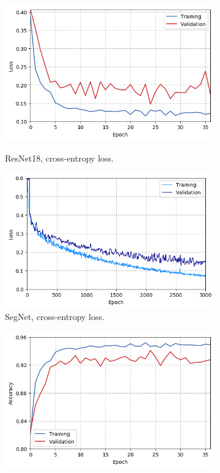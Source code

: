 \documentclass[10pt,conference,compsocconf]{IEEEtran}
\begin{document}
\begin{figure}
    \vspace*{-.5\baselineskip}
	\centering
    \begin{minipage}[t!]{.724\textwidth}
    \begin{subfigure}[t!]{0.5\textwidth}
        \centering
        \includegraphics[width=\textwidth]{img/resnet18_all_loss}
        \caption{ResNet18, cross-entropy loss.\label{fig:resnet_loss}}
        \includegraphics[width=\textwidth]{img/segnet_all_loss}
        \caption{SegNet, cross-entropy loss.\label{fig:segnet_loss}}
    \end{subfigure}
    \begin{subfigure}[t!]{0.5\textwidth}
    	\centering
        \includegraphics[width=\textwidth]{img/resnet18_all_acc}

\end{subfigure}
\end{minipage}
\end{figure}
\end{document}

